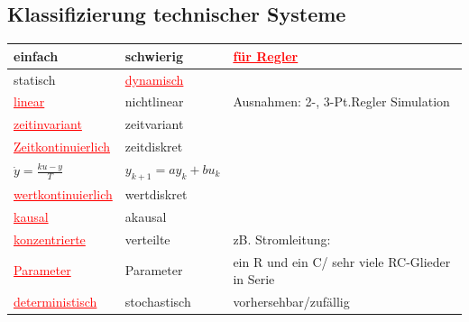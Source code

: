 	\subsection{Klassifizierung technischer Systeme}	
		\begin{tabular}{|l | l | l|}
        	\hline
        	einfach					&	schwierig			&	\textcolor{red}{\underline{für Regler}}\\
        	\hline
        	\hline
        	statisch				&	\textcolor{red}{\underline{dynamisch}}	&	\\
        	\hline
        	\textcolor{red}{\underline{linear}}			&	nichtlinear			&	Ausnahmen: 2-, 3-Pt.Regler
        	Simulation\\ 
        	\hline
        	\textcolor{red}{\underline{zeitinvariant}}	&	zeitvariant&\\
        	\hline
        	\textcolor{red}{\underline{Zeitkontinuierlich}}&	zeitdiskret	&\\
        	$\dot{y}=\frac{ku-y}{T}$&	$y_{k+1}=a y_k + b u_k$	&\\
        	\hline
        	\textcolor{red}{\underline{wertkontinuierlich}}&	wertdiskret&\\
        	\hline
        	\textcolor{red}{\underline{kausal}}			&	akausal	&\\
        	\hline
        	\textcolor{red}{\underline{konzentrierte}}	&	verteilte			&	zB. Stromleitung: \\
        	\textcolor{red}{\underline{Parameter}}		&	Parameter			&	ein R und ein C/ sehr viele
        	RC-Glieder in Serie\\
        	\hline
        	\textcolor{red}{\underline{deterministisch}}	&	stochastisch		&	vorhersehbar/zufällig\\
        	\hline
        \end{tabular}